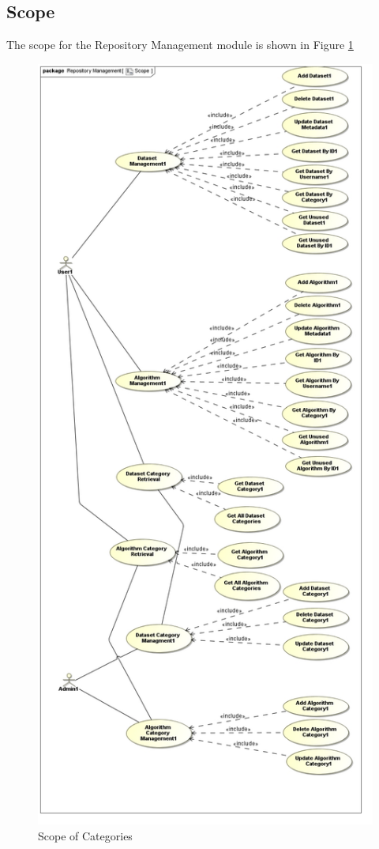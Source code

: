 \subsection{Scope}
The scope for the Repository Management module is shown in Figure \ref{fig:repoManScope}
\begin{figure}[H]
  \begin{center}
  \includegraphics[scale=0.3]{../Diagrams and Charts/Test Data/Scope.jpg}
  \caption{Scope of Categories}
  \label{fig:repoManScope}
  \end{center}  
\end{figure}

